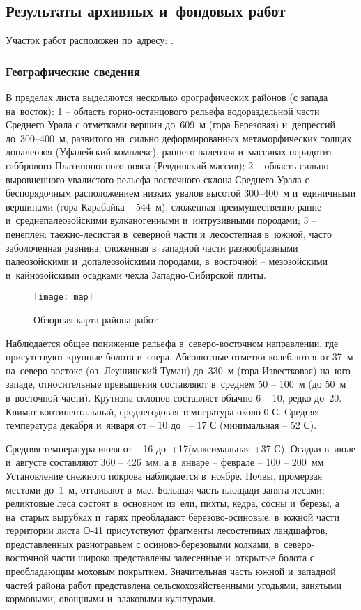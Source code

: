 \subsection{Результаты архивных и~фондовых работ}
Участок работ расположен по~адресу: \txtAddress.

\subsubsection{Географические сведения}
В пределах листа {\txtNomenclature} выделяются несколько орографических районов (с запада на~восток): 1 -- область горно-останцового рельефа водораздельной части Среднего Урала с отметками вершин до~609~м (гора Березовая) и~депрессий до~300--400~м, развитого на~сильно деформированных метаморфических толщах допалеозоя (Уфалейский комплекс), раннего палеозоя и~массивах перидотит - габбрового Платиноносного пояса (Ревдинский массив); 2 -- область сильно выровненного увалистого рельефа восточного склона Среднего Урала с беспорядочным расположением низких
увалов высотой 300--400~м и~единичными вершинами (гора Карабайка -- 544~м), сложенная преимущественно ранне- и~среднепалеозойскими вулканогенными и~интрузивными породами; 3  --  пенеплен: таежно-лесистая в~северной части и~лесостепная в~южной, часто заболоченная равнина, сложенная в~западной части разнообразными палеозойскими и~допалеозойскими породами, в~восточной  --  мезозойскими и~кайнозойскими осадками чехла Западно-Сибирской плиты. 
\begin{figure}[h]
	\centering
	\texttt{[image: map]}
	\caption{Обзорная карта района работ}
\end{figure}
Наблюдается общее понижение рельефа в~северо-восточном направлении, где присутствуют крупные болота и~озера. Абсолютные отметки колеблются от 37~м на~северо-востоке (оз. Леушинский Туман) до~330~м (гора Известковая) на~юго-западе, относительные превышения составляют в~среднем 50 -- 100~м (до 50~м в~восточной части). Крутизна склонов составляет обычно 6 -- 10\degree, редко до~20\degree.
Климат континентальный, среднегодовая температура около 0 \degree С. Средняя температура декабря и~января от  -- 10 до~ -- 17 \degree С (минимальная  -- 52 \degree С).

Средняя температура июля от +16 до~+17\degree (максимальная +37 \degree С). Осадки в~июле и~августе составляют 360 -- 426~мм, а в~январе -- феврале  --  100 -- 200~мм.
Установление снежного покрова наблюдается в~ноябре. Почвы, промерзая местами до~1~м, оттаивают в~мае. Большая часть площади занята лесами; реликтовые леса состоят в~основном из~ели, пихты, кедра, сосны и~березы, а на~старых вырубках и~гарях преобладают березово-осиновые. в~южной части территории листа О-41 присутствуют фрагменты лесостепных ландшафтов, представленных разнотравьем с осиново-березовыми колками, в~северо-восточной части широко представлены залесенные и~открытые болота с преобладающим моховым покрытием. Значительная часть южной и~западной частей района работ представлена сельскохозяйственными угодьями, занятыми кормовыми, овощными и~злаковыми культурами. 

